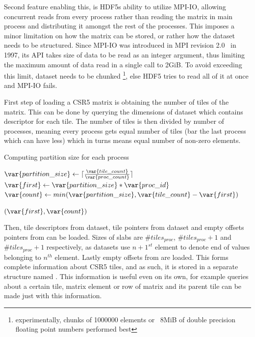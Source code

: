 \documentclass[thesis=M,english]{FITthesis}[2019/12/23]
\begin{document}
Second feature enabling this, is HDF5s ability to utilize MPI-IO, allowing concurrent
reads from every process rather than reading the matrix in main process
and distributing it amongst the rest of the processes. This imposes a minor limitation
on how the matrix can be stored, or rather how the dataset needs to be structured.
Since MPI-IO was introduced in MPI revision 2.0~\cite{mpi20} in 1997, its API takes
size of data to be read as an integer argument, thus limiting the maximum amount of data read
in a single call to 2GiB. To avoid exceeding this limit, dataset needs to be chunked
\footnote{experimentally, chunks of 1000000 elements or ~8MiB of double precision floating
    point numbers performed best}, else HDF5 tries to read all of it at once and MPI-IO fails.


First step of loading a CSR5 matrix is obtaining the number of tiles of the matrix. This can be
done by querying the dimensions of  dataset which contains descriptor for each tile.
The number of tiles is then divided by number of processes, meaning every process gets equal
number of tiles (bar the last process which can have less) which in turns means equal number
of non-zero elements.


\begin{algorithm}
    \caption{Computing partition size for each process}
    \begin{algorithmic}
        \State $\var{partition\_size} \gets \lceil\frac{\var{tile\_count}}{\var{proc\_count}}\rceil$
        \State $\var{first} \gets \var{partition\_size} * \var{proc\_id}$
        \State $\var{count} \gets min(\var{partition\_size}, \var{tile\_count} - \var{first})$

        \Return $(\var{first}, \var{count})$
        \EndFunction
    \end{algorithmic}
\end{algorithm}

Then, tile descriptors from  dataset, tile pointers from 
dataset and empty offsets pointers from  can be loaded.
Sizes of slabs are $\#tiles_{proc}$, $\#tiles_{proc} + 1$ and $\#tiles_{proc} + 1$
respectively, as  datasets use $n+1^{st}$ element to denote end of values
belonging to $n^{th}$ element. Lastly empty offsets from 
are loaded. This forms complete information about CSR5 tiles, and as such, it is
stored in a separate structure named . This information is useful
even on its own, for example queries about a certain tile, matrix element or row
of matrix and its parent tile can be made just with this information.
\end{document}
